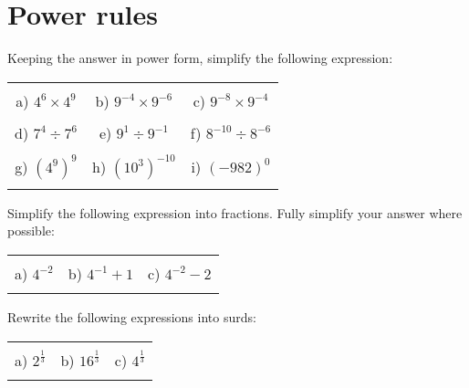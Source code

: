 \documentclass[12pt]{article}
\begin{document}
\section{Power rules}
Keeping the answer in power form, simplify the following expression:
\begin{table}[h!]
\centering
\begin{tabular}{c c c}
\hspace{5cm} & \hspace{5cm} & \hspace{5cm} \\
a) ${4}^{6}\times{4}^{9}$ & b) ${9}^{-4}\times{9}^{-6}$ & c) ${9}^{-8}\times{9}^{-4}$ \\ \\
d) ${7}^{4}\div{7}^{6}$ & e) ${9}^{1}\div{9}^{-1}$ & f) ${8}^{-10}\div{8}^{-6}$ \\ \\
g) $({4}^{9})^{9}$ & h) $({10}^{3})^{-10}$ & i) $({-982})^0$ \\ \\
\end{tabular}
\end{table}
\newline
Simplify the following expression into fractions. Fully simplify your answer where possible:
\begin{table}[h!]
\centering
\begin{tabular}{c c c}
\hspace{5cm} & \hspace{5cm} & \hspace{5cm} \\
a) ${4}^{-2}$ & b) ${4}^{-1} + {1}$ & c) ${4}^{-2} - {2}$ \\ \\
\end{tabular}
\end{table}
\newline
Rewrite the following expressions into surds:
\begin{table}[h!]
\centering
\begin{tabular}{c c c}
\hspace{5cm} & \hspace{5cm} & \hspace{5cm} \\
a) ${2}^\frac{1}{{3}}$ & b) ${16}^\frac{1}{{3}}$ & c) ${4}^\frac{1}{{3}}$ \\ \\
\end{tabular}
\end{table}
\newline
\newpage
\end{document}
